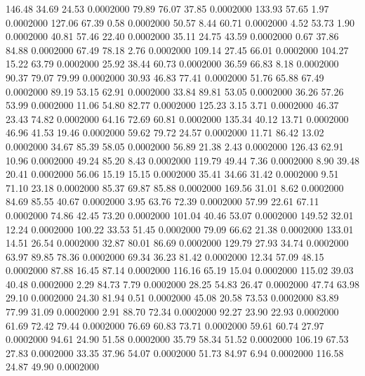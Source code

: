  146.48   34.69   24.53   0.0002000
  79.89   76.07   37.85   0.0002000
 133.93   57.65    1.97   0.0002000
 127.06   67.39    0.58   0.0002000
  50.57    8.44   60.71   0.0002000
   4.52   53.73    1.90   0.0002000
  40.81   57.46   22.40   0.0002000
  35.11   24.75   43.59   0.0002000
   0.67   37.86   84.88   0.0002000
  67.49   78.18    2.76   0.0002000
 109.14   27.45   66.01   0.0002000
 104.27   15.22   63.79   0.0002000
  25.92   38.44   60.73   0.0002000
  36.59   66.83    8.18   0.0002000
  90.37   79.07   79.99   0.0002000
  30.93   46.83   77.41   0.0002000
  51.76   65.88   67.49   0.0002000
  89.19   53.15   62.91   0.0002000
  33.84   89.81   53.05   0.0002000
  36.26   57.26   53.99   0.0002000
  11.06   54.80   82.77   0.0002000
 125.23    3.15    3.71   0.0002000
  46.37   23.43   74.82   0.0002000
  64.16   72.69   60.81   0.0002000
 135.34   40.12   13.71   0.0002000
  46.96   41.53   19.46   0.0002000
  59.62   79.72   24.57   0.0002000
  11.71   86.42   13.02   0.0002000
  34.67   85.39   58.05   0.0002000
  56.89   21.38    2.43   0.0002000
 126.43   62.91   10.96   0.0002000
  49.24   85.20    8.43   0.0002000
 119.79   49.44    7.36   0.0002000
   8.90   39.48   20.41   0.0002000
  56.06   15.19   15.15   0.0002000
  35.41   34.66   31.42   0.0002000
   9.51   71.10   23.18   0.0002000
  85.37   69.87   85.88   0.0002000
 169.56   31.01    8.62   0.0002000
  84.69   85.55   40.67   0.0002000
   3.95   63.76   72.39   0.0002000
  57.99   22.61   67.11   0.0002000
  74.86   42.45   73.20   0.0002000
 101.04   40.46   53.07   0.0002000
 149.52   32.01   12.24   0.0002000
 100.22   33.53   51.45   0.0002000
  79.09   66.62   21.38   0.0002000
 133.01   14.51   26.54   0.0002000
  32.87   80.01   86.69   0.0002000
 129.79   27.93   34.74   0.0002000
  63.97   89.85   78.36   0.0002000
  69.34   36.23   81.42   0.0002000
  12.34   57.09   48.15   0.0002000
  87.88   16.45   87.14   0.0002000
 116.16   65.19   15.04   0.0002000
 115.02   39.03   40.48   0.0002000
   2.29   84.73    7.79   0.0002000
  28.25   54.83   26.47   0.0002000
  47.74   63.98   29.10   0.0002000
  24.30   81.94    0.51   0.0002000
  45.08   20.58   73.53   0.0002000
  83.89   77.99   31.09   0.0002000
   2.91   88.70   72.34   0.0002000
  92.27   23.90   22.93   0.0002000
  61.69   72.42   79.44   0.0002000
  76.69   60.83   73.71   0.0002000
  59.61   60.74   27.97   0.0002000
  94.61   24.90   51.58   0.0002000
  35.79   58.34   51.52   0.0002000
 106.19   67.53   27.83   0.0002000
  33.35   37.96   54.07   0.0002000
  51.73   84.97    6.94   0.0002000
 116.58   24.87   49.90   0.0002000
